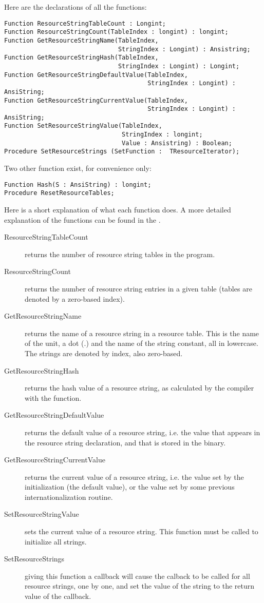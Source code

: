 Here are the declarations of all the functions:
\begin{verbatim}
Function ResourceStringTableCount : Longint;
Function ResourceStringCount(TableIndex : longint) : longint;
Function GetResourceStringName(TableIndex,
                               StringIndex : Longint) : Ansistring;
Function GetResourceStringHash(TableIndex,
                               StringIndex : Longint) : Longint;
Function GetResourceStringDefaultValue(TableIndex,
                                       StringIndex : Longint) : AnsiString;
Function GetResourceStringCurrentValue(TableIndex,
                                       StringIndex : Longint) : AnsiString;
Function SetResourceStringValue(TableIndex,
                                StringIndex : longint;
                                Value : Ansistring) : Boolean;
Procedure SetResourceStrings (SetFunction :  TResourceIterator);
\end{verbatim}
Two other function exist, for convenience only:
\begin{verbatim}
Function Hash(S : AnsiString) : longint;
Procedure ResetResourceTables;
\end{verbatim}
Here is a short explanation of what each function does. A more detailed
explanation of the functions can be found in the .
\begin{description}
\item[ResourceStringTableCount] returns the number of resource string tables
in the program.
\item[ResourceStringCount] returns the number of resource string entries in
a given table (tables are denoted by a zero-based index).
\item[GetResourceStringName] returns the name of a resource string in a
resource table. This is the name of the unit, a dot (.) and the name of
the string constant, all in lowercase. The strings are denoted by index,
also zero-based.
\item[GetResourceStringHash] returns the hash value of a resource string, as
calculated by the compiler with the  function.
\item[GetResourceStringDefaultValue] returns the default value of a resource
string, i.e. the value that appears in the resource string declaration, and
that is stored in the binary.
\item[GetResourceStringCurrentValue] returns the current value of a resource
string, i.e. the value set by the initialization (the default value), or the
value set by some previous internationalization routine.
\item[SetResourceStringValue] sets the current value of a resource string.
This function must be called to initialize all strings.
\item[SetResourceStrings] giving this function a callback will cause the
calback to be called for all resource strings, one by one, and set the value
of the string to the return value of the callback.
\end{description}
